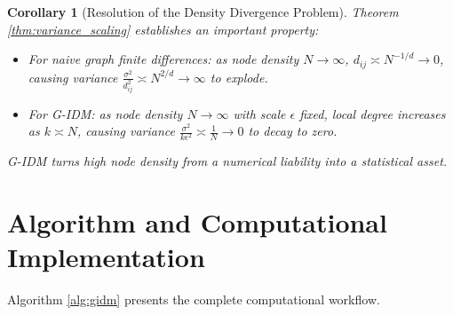 \documentclass[11pt,a4paper]{article}
\newtheorem{corollary}[theorem]{Corollary}
\theoremstyle{definition}
\begin{document}
\begin{corollary}[Resolution of the Density Divergence Problem]
Theorem \ref{thm:variance_scaling} establishes an important property:
\begin{itemize}
    \item For naive graph finite differences: as node density $N \to \infty$, $d_{ij} \asymp N^{-1/d} \to 0$, causing variance $\frac{\sigma^2}{d_{ij}^2} \asymp N^{2/d} \to \infty$ to explode.
    \item For G-IDM: as node density $N \to \infty$ with scale $\epsilon$ fixed, local degree increases as $k \asymp N$, causing variance $\frac{\sigma^2}{k \epsilon^2} \asymp \frac{1}{N} \to 0$ to decay to zero.
\end{itemize}
G-IDM turns high node density from a numerical liability into a statistical asset.
\end{corollary}


\section{Algorithm and Computational Implementation}
\label{sec:algorithm}

Algorithm \ref{alg:gidm} presents the complete computational workflow.
\end{document}
